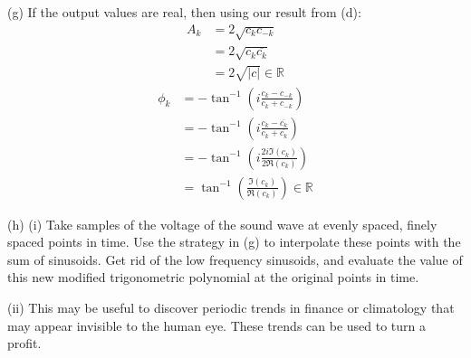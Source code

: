 \documentclass{article}
\begin{document}
\begin{solution}
    (g) If the output values are real, then using our result from (d):
    \begin{align*}
        A_k &=2\sqrt{c_kc_{-k}}\\
        &=2\sqrt{c_k\overline{c_k}}\\
        &=2\sqrt{|c|}\in \mathbb{R}
    \end{align*}
    \begin{align*}
        \phi_k &= -\tan^{-1}\left(i\frac{c_k-c_{-k}}{c_k+c_{-k}}\right)\\
        &= -\tan^{-1}\left(i\frac{c_k-\overline{c_k}}{c_k+\overline{c_k}}\right)\\
        &= -\tan^{-1}\left(i\frac{2i\Im(c_k)}{2\Re(c_k)}\right)\\
        &= \tan^{-1}\left(\frac{\Im(c_k)}{\Re(c_k)}\right) \in \mathbb{R}
    \end{align*}

    \pagebreak 

    (h) (i) Take samples of the voltage of the sound wave at evenly spaced, finely spaced points in time.
    Use the strategy in (g) to interpolate these points with the sum of sinusoids.
    Get rid of the low frequency sinusoids, and evaluate the value of this new modified trigonometric polynomial at the original points in time.

    (ii) This may be useful to discover periodic trends in finance or climatology that may appear invisible to the human eye.
    These trends can be used to turn a profit.




\end{solution}
\end{document}
